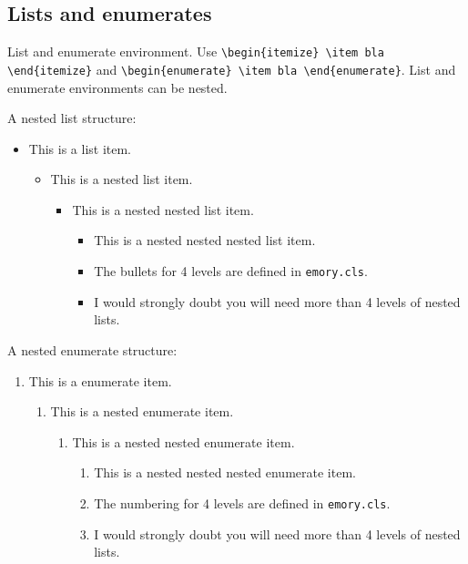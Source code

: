 \documentclass[draft]{emory}
\begin{document}
\subsection{Lists and enumerates}
List and enumerate environment. Use \Verb|\begin{itemize} \item bla \end{itemize}|
and \Verb|\begin{enumerate} \item bla \end{enumerate}|. List and enumerate environments
can be nested.

A nested list structure:
\begin{itemize}
  \item This is a list item.
  \begin{itemize}
    \item This is a nested list item.
    \begin{itemize}
      \item This is a nested nested list item.
      \begin{itemize}
        \item This is a nested nested nested list item. 
        \item The bullets for 4 levels are defined in \Verb|emory.cls|.
        \item I would strongly doubt you will need more than 4 levels of nested lists.
      \end{itemize}
    \end{itemize}
  \end{itemize}    
\end{itemize}

A nested enumerate structure:
\begin{enumerate}
  \item This is a enumerate item.
  \begin{enumerate}
    \item This is a nested enumerate item.
    \begin{enumerate}
      \item This is a nested nested enumerate item.
      \begin{enumerate}
        \item This is a nested nested nested enumerate item. 
        \item The numbering for 4 levels are defined in \Verb|emory.cls|.
        \item I would strongly doubt you will need more than 4 levels of nested lists.
      \end{enumerate}
    \end{enumerate}
  \end{enumerate}    
\end{enumerate}
\end{document}
